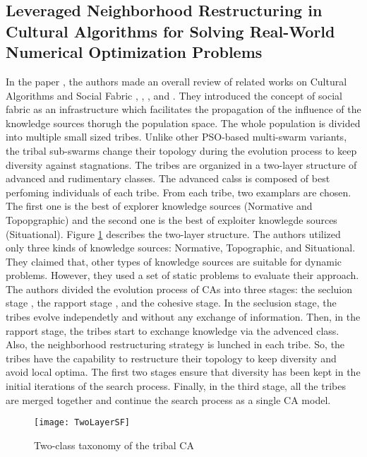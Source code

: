 \subsection{Leveraged Neighborhood Restructuring in Cultural Algorithms for Solving Real-World Numerical Optimization Problems}
In the paper \cite{ali2016leveraged}, the authors made an overall review of related works on Cultural Algorithms and Social Fabric \cite{peng2005knowledge}, \cite{reynolds2008social}, \cite{chen2006tribe}, and \cite{785509}. They introduced the concept of social fabric as an infrastructure which facilitates the propagation of the influence of the knowledge sources thorugh the population space. The whole population is divided into multiple small sized tribes. Unlike other PSO-based multi-swarm variants, the tribal sub-swarms change their topology during the evolution process to keep diversity against stagnations.\newline
The tribes are organized in a two-layer structure of advanced and rudimentary classes. The advanced calss is composed of best perfoming individuals of each tribe. From each tribe, two examplars are chosen. The first one is the best of explorer knowledge sources (Normative and Topopgraphic) and the second one is the best of exploiter knowlegde sources (Situational). Figure \ref{fig:TwoLayerSF} describes the two-layer structure. The authors utilized only three kinds of knowledge sources: Normative, Topographic, and Situational. They claimed that, other types of knowledge sources are suitable for dynamic problems. However, they used a set of static problems to evaluate their approach. The authors divided the evolution process of CAs into three stages: the secluion stage , the rapport stage , and the cohesive stage. In the seclusion stage, the tribes evolve independetly and without any exchange of information. Then, in the rapport stage, the tribes start to exchange knowledge via the advenced class. Also, the neighborhood restructuring strategy is lunched in each tribe. So, the tribes have the capability to restructure their topology to keep diversity and avoid local optima. The first two stages ensure that diversity has been kept in the initial iterations of the search process. Finally, in the third stage, all the tribes are merged together and continue the search process as a single CA model.
\begin{figure}[h]
	\texttt{[image: TwoLayerSF]}
	\centering
	\caption{Two-class taxonomy of the tribal CA \cite{kobti2013heterogeneous}}
	\label{fig:TwoLayerSF}
\end{figure}
